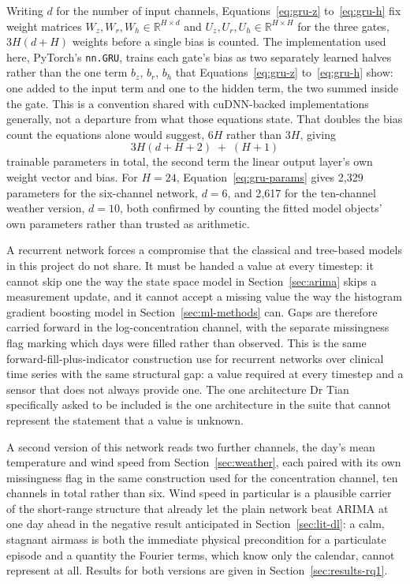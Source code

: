 \documentclass[12pt,a4paper]{report}
\begin{document}
Writing $d$ for the number of input channels, Equations~\ref{eq:gru-z}
to~\ref{eq:gru-h} fix weight matrices $W_z,W_r,W_h \in \mathbb{R}^{H\times d}$
and $U_z,U_r,U_h \in \mathbb{R}^{H\times H}$ for the three gates, $3H(d+H)$
weights before a single bias is counted. The implementation used here,
PyTorch's \texttt{nn.GRU}, trains each gate's bias as two separately
learned halves rather than the one term $b_z$, $b_r$, $b_h$ that
Equations~\ref{eq:gru-z} to~\ref{eq:gru-h} show: one added to the input
term and one to the hidden term, the two summed inside the gate. This is a
convention shared with cuDNN-backed implementations generally, not a
departure from what those equations state. That doubles the bias count the
equations alone would suggest, $6H$ rather than $3H$, giving
\begin{equation}
3H(d+H+2) \;+\; (H+1)
\label{eq:gru-params}
\end{equation}
trainable parameters in total, the second term the linear output layer's
own weight vector and bias. For $H=24$, Equation~\ref{eq:gru-params} gives
2{,}329 parameters for the six-channel network, $d=6$, and 2{,}617 for the
ten-channel weather version, $d=10$, both confirmed by counting
the fitted model objects' own parameters rather than trusted as arithmetic.

A recurrent network forces a compromise that the classical and tree-based
models in this project do not share. It must be handed a value at every
timestep: it cannot skip one the way the state space model in
Section~\ref{sec:arima} skips a measurement update, and it cannot accept a
missing value the way the histogram gradient boosting model in
Section~\ref{sec:ml-methods} can. Gaps are therefore carried forward in the
log-concentration channel, with the separate missingness flag marking which
days were filled rather than observed. This is the same
forward-fill-plus-indicator construction \citet{che2018rnn} use for
recurrent networks over clinical time series with the same structural gap:
a value required at every timestep and a sensor that does not always
provide one. The one architecture Dr Tian specifically asked to be included
is the one architecture in the suite that cannot represent the statement
that a value is unknown.

A second version of this network reads two further channels, the day's mean
temperature and wind speed from Section~\ref{sec:weather}, each paired with
its own missingness flag in the same construction used for the
concentration channel, ten channels in total rather than six. Wind speed in
particular is a plausible carrier of the short-range structure that already
let the plain network beat ARIMA at one day ahead in the negative result
anticipated in Section~\ref{sec:lit-dl}: a calm, stagnant airmass is both the
immediate physical precondition for a particulate episode and a quantity the
Fourier terms, which know only the calendar, cannot represent at all. Results
for both versions are given in Section~\ref{sec:results-rq1}.
\end{document}
